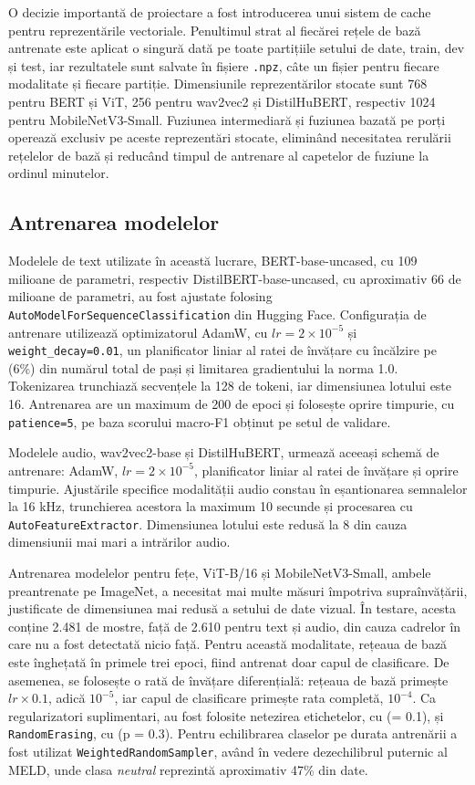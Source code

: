 \documentclass[12pt, a4paper]{article}
\begin{document}
O decizie importantă de proiectare a fost introducerea unui sistem de cache pentru reprezentările vectoriale. Penultimul strat al fiecărei rețele de bază antrenate este aplicat o singură dată pe toate partițiile setului de date, train, dev și test, iar rezultatele sunt salvate în fișiere \texttt{.npz}, câte un fișier pentru fiecare modalitate și fiecare partiție. Dimensiunile reprezentărilor stocate sunt 768 pentru BERT și ViT, 256 pentru wav2vec2 și DistilHuBERT, respectiv 1024 pentru MobileNetV3-Small. Fuziunea intermediară și fuziunea bazată pe porți operează exclusiv pe aceste reprezentări stocate, eliminând necesitatea rerulării rețelelor de bază și reducând timpul de antrenare al capetelor de fuziune la ordinul minutelor.

\subsection{Antrenarea modelelor}

Modelele de text utilizate în această lucrare, BERT-base-uncased, cu 109 milioane de parametri, respectiv DistilBERT-base-uncased, cu aproximativ 66 de milioane de parametri, au fost ajustate folosing \texttt{AutoModelForSequenceClassification} din Hugging Face. Configurația de antrenare utilizează optimizatorul AdamW, cu \(lr = 2 \times 10^{-5}\) și \texttt{weight\_decay=0.01}, un planificator liniar al ratei de învățare cu încălzire pe (6\%) din numărul total de pași și limitarea gradientului la norma 1.0. Tokenizarea trunchiază secvențele la 128 de tokeni, iar dimensiunea lotului este 16. Antrenarea are un maximum de 200 de epoci și folosește oprire timpurie, cu \texttt{patience=5}, pe baza scorului macro-F1 obținut pe setul de validare.

Modelele audio, wav2vec2-base și DistilHuBERT, urmează aceeași schemă de antrenare: AdamW, \(lr = 2 \times 10^{-5}\), planificator liniar al ratei de învățare și oprire timpurie. Ajustările specifice modalității audio constau în eșantionarea semnalelor la 16 kHz, trunchierea acestora la maximum 10 secunde și procesarea cu \texttt{AutoFeatureExtractor}. Dimensiunea lotului este redusă la 8 din cauza dimensiunii mai mari a intrărilor audio.

Antrenarea modelelor pentru fețe, ViT-B/16 și MobileNetV3-Small, ambele preantrenate pe ImageNet, a necesitat mai multe măsuri împotriva supraînvățării, justificate de dimensiunea mai redusă a setului de date vizual. În testare, acesta conține 2.481 de mostre, față de 2.610 pentru text și audio, din cauza cadrelor în care nu a fost detectată nicio față. Pentru această modalitate, rețeaua de bază este înghețată în primele trei epoci, fiind antrenat doar capul de clasificare. De asemenea, se folosește o rată de învățare diferențială: rețeaua de bază primește \(lr \times 0.1\), adică \(10^{-5}\), iar capul de clasificare primește rata completă, \(10^{-4}\). Ca regularizatori suplimentari, au fost folosite netezirea etichetelor, cu (\varepsilon = 0.1), și \texttt{RandomErasing}, cu (p = 0.3). Pentru echilibrarea claselor pe durata antrenării a fost utilizat \texttt{WeightedRandomSampler}, având în vedere dezechilibrul puternic al MELD, unde clasa \textit{neutral} reprezintă aproximativ 47\% din date.
\end{document}
